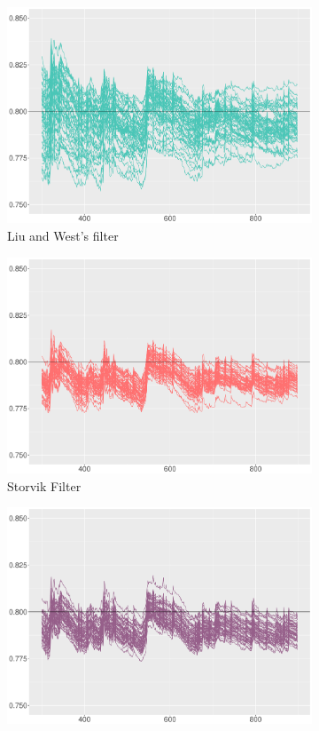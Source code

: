 \begin{figure}[h]
\centering
  \begin{subfigure}[t]{0.46\textwidth}
\includegraphics[width=\textwidth]{Chapters/04Filtering/plot/LWchain100.pdf}
\caption{Liu and West's filter}
  \end{subfigure}
  \begin{subfigure}[t]{0.46\textwidth}
\includegraphics[width=\textwidth]{Chapters/04Filtering/plot/STchain100.pdf}
\caption{Storvik Filter}
  \end{subfigure}
  \begin{subfigure}[t]{0.46\textwidth}
\includegraphics[width=\textwidth]{Chapters/04Filtering/plot/PLchain100.pdf}

\end{subfigure}
\end{figure}
